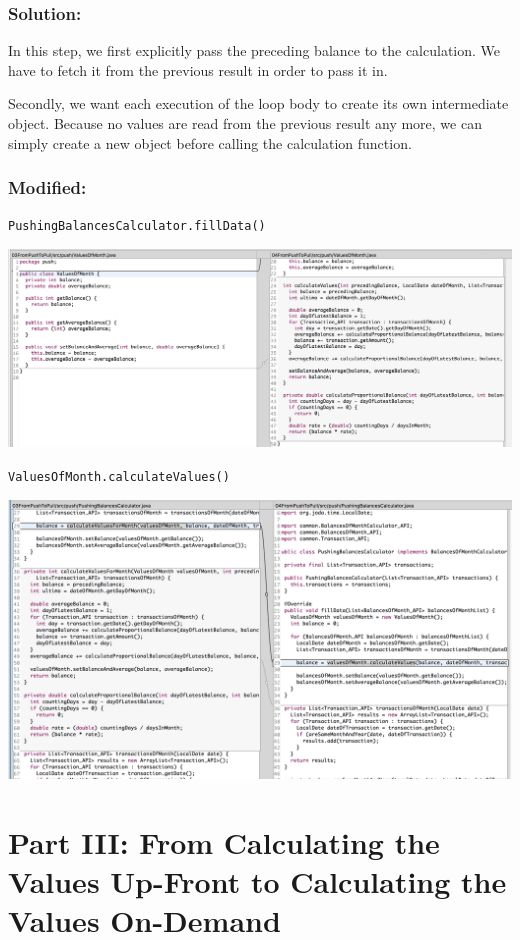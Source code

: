 \documentclass[a4paper,fleqn,titlepage,11pt]{article}
\begin{document}
\subsubsection*{Solution:}


In this step, we first explicitly pass the preceding balance to the calculation. We have to fetch it from the previous result in order to pass it in.

Secondly, we want each execution of the loop body to create its own intermediate object. Because no values are read from the previous result any more, we can simply create a new object before calling the calculation function.

\subsubsection*{Modified:}

\texttt{PushingBalancesCalculator.fillData()}

\includegraphics[width=1\textwidth]{CompareViews/04-05-1.png}

\texttt{ValuesOfMonth.calculateValues()}

\includegraphics[width=1\textwidth]{CompareViews/04-05-2.png}


\clearpage
\section*{Part III: From Calculating the Values Up-Front to Calculating the Values On-Demand}
\end{document}
